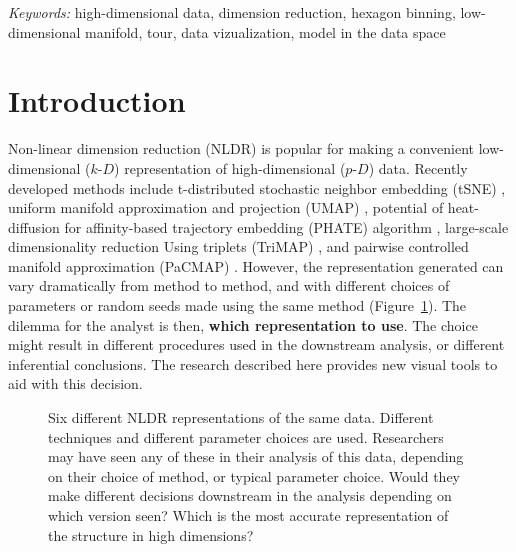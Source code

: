 \documentclass[
  12pt]{article}
\newcommand\pD{$p\text{-}D$}
\newcommand\kD{$k\text{-}D$}
\begin{document}
\noindent%
{\it Keywords:} high-dimensional data, dimension reduction, hexagon
binning, low-dimensional manifold, tour, data vizualization, model in
the data space
\vfill

\newpage
{} %



\section{Introduction}\label{introduction}

Non-linear dimension reduction (NLDR) is popular for making a convenient
low-dimensional (\kD{}) representation of high-dimensional (\pD{}) data.
Recently developed methods include t-distributed stochastic neighbor
embedding (tSNE) \citep{laurens2008}, uniform manifold approximation and
projection (UMAP) \citep{leland2018}, potential of heat-diffusion for
affinity-based trajectory embedding (PHATE) algorithm \citep{moon2019},
large-scale dimensionality reduction Using triplets (TriMAP)
\citep{amid2022}, and pairwise controlled manifold approximation
(PaCMAP) \citep{yingfan2021}. However, the representation generated can
vary dramatically from method to method, and with different choices of
parameters or random seeds made using the same method
(Figure~\ref{fig-NLDR-variety}). The dilemma for the analyst is then,
\textbf{which representation to use}. The choice might result in
different procedures used in the downstream analysis, or different
inferential conclusions. The research described here provides new visual
tools to aid with this decision.

\begin{figure}


\caption{\label{fig-NLDR-variety}Six different NLDR representations of
the same data. Different techniques and different parameter choices are
used. Researchers may have seen any of these in their analysis of this
data, depending on their choice of method, or typical parameter choice.
Would they make different decisions downstream in the analysis depending
on which version seen? Which is the most accurate representation of the
structure in high dimensions?}

\end{figure}%
\end{document}
